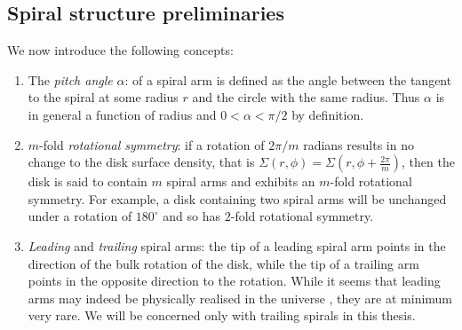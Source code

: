 \subsection{Spiral structure preliminaries}
We now introduce the following concepts:
\begin{enumerate}
    \item The \textit{pitch angle} $\alpha$: of a spiral arm is defined as the angle between the tangent to the spiral at some radius $r$ and the circle with the same radius. 
    Thus $\alpha$ is in general a function of radius and $0 < \alpha < \pi/2$ by definition.
    \item $m$-fold \textit{rotational symmetry}: if a rotation of $2\pi/m$ radians results in no change to the disk surface density, that is $\Sigma(r,\phi)=\Sigma(r,\phi+\frac{2\pi}{m})$, then the disk is said to contain $m$ spiral arms and exhibits an $m$-fold rotational symmetry. 
    For example, a disk containing two spiral arms will be unchanged under a rotation of $180^\circ$ and so has $2$-fold rotational symmetry.
    \item \textit{Leading} and \textit{trailing} spiral arms: the tip of a leading spiral arm points in the direction of the bulk rotation of the disk, while the tip of a trailing arm points in the opposite direction to the rotation. 
    While it seems that leading arms may indeed be physically realised in the universe \citep[e.g.][]{vaisanen2008}, they are at minimum very rare. 
    We will be concerned only with trailing spirals in this thesis.
\end{enumerate}

